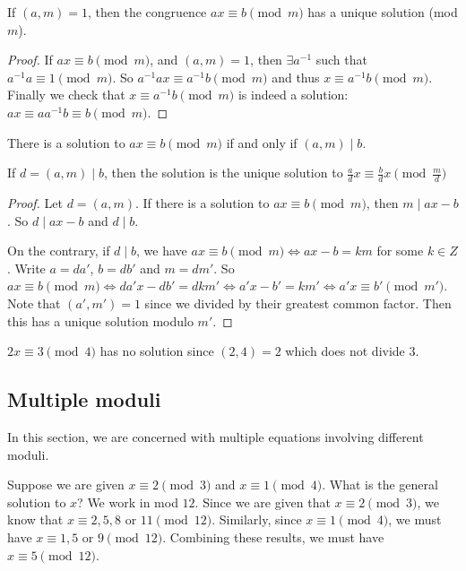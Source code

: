 \documentclass[a4paper]{article}
\begin{document}
\begin{cor}
  If $(a, m) = 1$, then the congruence $ax \equiv b\pmod m$ has a unique solution (mod $m$).
\end{cor}

\begin{proof}
  If $ax\equiv b\pmod m$, and $(a, m) = 1$, then $\exists a^{-1}$ such that $a^{-1}a\equiv 1\pmod m$. So $a^{-1}ax\equiv a^{-1}b\pmod m$ and thus $x\equiv a^{-1}b\pmod m$. Finally we check that $x \equiv a^{-1}b \pmod m$ is indeed a solution: $ax \equiv aa^{-1}b \equiv b \pmod m$.
\end{proof}

\begin{prop}
  There is a solution to $ax \equiv b\pmod m$ if and only if $(a, m) \mid b$.

  If $d = (a, m) \mid b$, then the solution is the unique solution to $\frac{a}{d}x \equiv \frac{b}{d} x\pmod {\frac{m}{d}}$
\end{prop}

\begin{proof}
  Let $d = (a, m)$. If there is a solution to $ax \equiv b\pmod m$, then $m \mid ax - b$. So $d \mid ax - b$ and $d \mid b$.

  On the contrary, if $d \mid b$, we have $ax \equiv b\pmod m \Leftrightarrow ax - b = km$ for some $k\in Z$. Write $a = da'$, $b = db'$ and $m = dm'$. So $ax\equiv b\pmod m \Leftrightarrow da'x - db' = dkm'\Leftrightarrow a'x - b' = km'\Leftrightarrow a'x \equiv b'\pmod {m'}$. Note that $(a', m') = 1$ since we divided by their greatest common factor. Then this has a unique solution modulo $m'$.
\end{proof}

\begin{eg}
  $2x \equiv 3 \pmod 4$ has no solution since $(2, 4) = 2$ which does not divide $3$.
\end{eg}

\subsection{Multiple moduli}
In this section, we are concerned with multiple equations involving different moduli.

Suppose we are given $x \equiv 2\pmod 3$ and $x\equiv 1\pmod 4$. What is the general solution to $x$? We work in mod $12$. Since we are given that $x\equiv 2\pmod 3$, we know that $x \equiv 2, 5, 8$ or $11 \pmod {12}$. Similarly, since $x \equiv 1 \pmod 4$, we must have $x \equiv 1, 5$ or $9\pmod {12}$. Combining these results, we must have $x \equiv 5\pmod {12}$.
\end{document}
